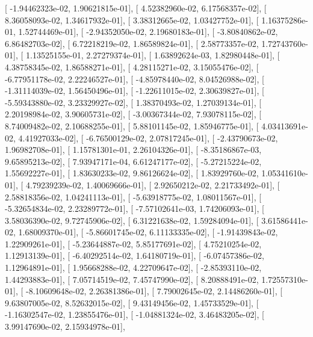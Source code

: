 \documentclass{article}
\begin{document}
       [ -1.94462323e-02,   1.90621815e-01],
       [  4.52382960e-02,   6.17568357e-02],
       [  8.36058093e-02,   1.34617932e-01],
       [  3.38312665e-02,   1.03427752e-01],
       [  1.16375286e-01,   1.52744469e-01],
       [ -2.94352050e-02,   2.19680183e-01],
       [ -3.80840862e-02,   6.86482703e-02],
       [  6.72218219e-02,   1.86589824e-01],
       [  2.58773357e-02,   1.72743760e-01],
       [  1.13525155e-01,   2.27279374e-01],
       [  1.63892624e-03,   1.82980448e-01],
       [  4.38758345e-02,   1.86588271e-01],
       [  4.28115271e-02,   3.15055476e-02],
       [ -6.77951178e-02,   2.22246527e-01],
       [ -4.85978440e-02,   8.04526988e-02],
       [ -1.31114039e-02,   1.56450496e-01],
       [ -1.22611015e-02,   2.30639827e-01],
       [ -5.59343880e-02,   3.23329927e-02],
       [  1.38370493e-02,   1.27039134e-01],
       [  2.20198984e-02,   3.90605731e-02],
       [ -3.00367344e-02,   7.93078115e-02],
       [  8.74009482e-02,   2.10688255e-01],
       [  5.88101145e-02,   1.85946775e-01],
       [  4.03413691e-02,   4.41927033e-02],
       [ -6.76500129e-02,   2.07817245e-01],
       [ -2.43790673e-02,   1.96982708e-01],
       [  1.15781301e-01,   2.26104326e-01],
       [ -8.35186867e-03,   9.65895213e-02],
       [  7.93947171e-04,   6.61247177e-02],
       [ -5.27215224e-02,   1.55692227e-01],
       [  1.83630233e-02,   9.86126624e-02],
       [  1.83929760e-02,   1.05341610e-01],
       [  4.79239239e-02,   1.40069666e-01],
       [  2.92650212e-02,   2.21733492e-01],
       [  2.58818356e-02,   1.04241113e-01],
       [ -5.63918775e-02,   1.08011567e-01],
       [ -5.32654834e-02,   2.23289772e-01],
       [ -7.57102641e-03,   1.74206093e-01],
       [  3.58036390e-02,   9.72745906e-02],
       [  6.31221638e-02,   1.59284094e-01],
       [  3.61586441e-02,   1.68009370e-01],
       [ -5.86601745e-02,   6.11133335e-02],
       [ -1.91439843e-02,   1.22909261e-01],
       [ -5.23644887e-02,   5.85177691e-02],
       [  4.75210254e-02,   1.12913139e-01],
       [ -6.40292514e-02,   1.64180719e-01],
       [ -6.07457386e-02,   1.12964891e-01],
       [  1.95668288e-02,   4.22709647e-02],
       [ -2.85393110e-02,   1.44293883e-01],
       [  7.05714519e-02,   7.45747990e-02],
       [  8.20888491e-02,   1.72557310e-01],
       [ -8.10609648e-02,   2.26381386e-01],
       [  7.79002645e-02,   2.14486260e-01],
       [  9.63807005e-02,   8.52632015e-02],
       [  9.43149456e-02,   1.45733529e-01],
       [ -1.16302547e-02,   1.23855476e-01],
       [ -1.04881324e-02,   3.46483205e-02],
       [  3.99147690e-02,   2.15934978e-01],
\end{document}
